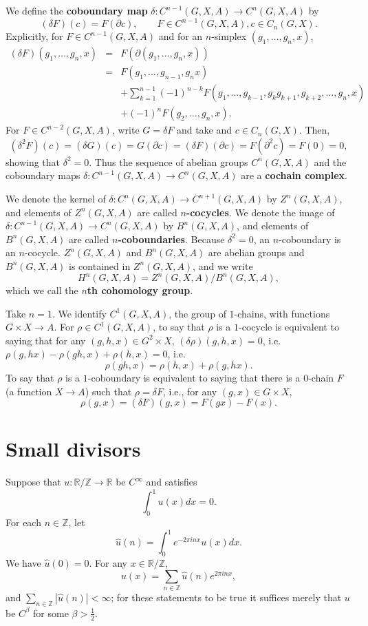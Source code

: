 \documentclass{article}
\theoremstyle{definition}
\begin{document}
We define the \textbf{coboundary map} $\delta:C^{n-1}(G,X,A) \to C^n(G,X,A)$ by
\[
(\delta F)(c) = F(\partial c), \qquad F \in C^{n-1}(G,X,A), c \in C_n(G,X).
\]
Explicitly, for $F \in C^{n-1}(G,X,A)$ and for an $n$-simplex  $(g_1,\ldots,g_n,x)$,
\begin{eqnarray*}
(\delta F)(g_1,\ldots,g_n,x)&=&F(\partial (g_1,\ldots,g_n,x))\\
&=&F(g_1,\ldots,g_{n-1},g_n x)\\
&&+\sum_{k=1}^{n-1}(-1)^{n-k} F (g_1,\ldots,g_{k-1},g_k g_{k+1},g_{k+2},\ldots,g_n,x)\\
&&+(-1)^n F (g_2,\ldots,g_n,x).
\end{eqnarray*}
For $F \in C^{n-2}(G,X,A)$, write $G=\delta F$ and take and $c \in C_n(G,X)$. Then,
\[
(\delta^2 F)(c) = (\delta G)(c) = G(\partial c) = (\delta F)(\partial c) = F(\partial^2 c)=F(0)=0,
\]
showing that $\delta^2=0$. Thus the sequence of abelian groups $C^n(G,X,A)$ and the coboundary maps
$\delta:C^{n-1}(G,X,A) \to C^n(G,X,A)$ are  a \textbf{cochain complex}.

We denote the kernel of $\delta:C^n(G,X,A) \to C^{n+1}(G,X,A)$ by 
$Z^n(G,X,A)$, and elements of $Z^n(G,X,A)$ are called \textbf{$n$-cocycles}. We denote
the image of $\delta:C^{n-1}(G,X,A) \to C^n(G,X,A)$ by $B^n(G,X,A)$, and elements of $B^n(G,X,A)$ are called
\textbf{$n$-coboundaries}. Because $\delta^2=0$, an $n$-coboundary is an $n$-cocycle.
$Z^n(G,X,A)$ and $B^n(G,X,A)$ are abelian groups and $B^n(G,X,A)$ is contained in $Z^n(G,X,A)$, and we write
\[
H^n(G,X,A) = Z^n(G,X,A) / B^n(G,X,A),
\]
which we call the \textbf{$n$th cohomology group}.

Take $n=1$. We identify $C^1(G,X,A)$, the group of $1$-chains, with functions $G \times X \to A$. 
For $\rho \in C^1(G,X,A)$, to say that
$\rho$ is a $1$-cocycle is equivalent to saying that for any $(g,h,x) \in G^2 \times X$,
$(\delta \rho)(g,h,x)=0$, i.e.
$\rho(g,hx)-\rho(gh,x)+\rho(h,x)=0$, i.e.
\[
\rho(gh,x)=\rho(h,x)+\rho(g,hx).
\]
To say that $\rho$ is a $1$-coboundary is equivalent to saying that there is a $0$-chain $F$ (a function $X \to A$)
such that $\rho = \delta F$, i.e., for any $(g,x) \in G \times X$,
\[
\rho(g,x) = (\delta F)(g,x) = F(gx)-F(x).
\]


\section{Small divisors}
Suppose that $u:\mathbb{R} / \mathbb{Z} \to \mathbb{R}$ be $C^\infty$ and satisfies
\[
\int_0^1 u(x) dx=0.
\]
For each $n \in \mathbb{Z}$, let
\[
\widehat{u}(n) = \int_0^1 e^{-2\pi i nx} u(x) dx.
\]
We have $\widehat{u}(0)=0$. For any $x \in \mathbb{R} / \mathbb{Z}$,
\[
u(x) = \sum_{n \in \mathbb{Z}} \widehat{u}(n) e^{2\pi i nx},
\]
and $\sum_{n \in \mathbb{Z}} |\widehat{u}(n)|<\infty$; for these statements to be true it suffices merely that
$u$ be $C^\beta$ for some $\beta>\frac{1}{2}$. 
\end{document}
